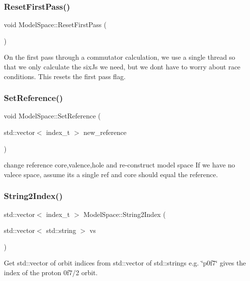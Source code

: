 \subsubsection{\texorpdfstring{Reset\+First\+Pass()}{ResetFirstPass()}}
{\footnotesize\ttfamily void Model\+Space\+::\+Reset\+First\+Pass (\begin{DoxyParamCaption}{ }\end{DoxyParamCaption})}

On the first pass through a commutator calculation, we use a single thread so that we only calculate the sixJ\textquotesingle{}s we need, but we don\textquotesingle{}t have to worry about race conditions. This resets the first pass flag. \mbox{\label{classModelSpace_a2c0036022f88a7f478e10c3d6006531e}} 
\subsubsection{\texorpdfstring{Set\+Reference()}{SetReference()}}
{\footnotesize\ttfamily void Model\+Space\+::\+Set\+Reference (\begin{DoxyParamCaption}\item[{std\+::vector$<$ index\+\_\+t $>$}]{new\+\_\+reference }\end{DoxyParamCaption})}

change reference core,valence,hole and re-\/construct model space If we have no valece space, assume it\textquotesingle{}s a single ref and core should equal the reference. \mbox{\label{classModelSpace_a11ac7aee125fb0a97cd3f1394c4cdb8f}} 
\subsubsection{\texorpdfstring{String2\+Index()}{String2Index()}}
{\footnotesize\ttfamily std\+::vector$<$ index\+\_\+t $>$ Model\+Space\+::\+String2\+Index (\begin{DoxyParamCaption}\item[{std\+::vector$<$ std\+::string $>$}]{vs }\end{DoxyParamCaption})}

Get std\+::vector of orbit indices from std\+::vector of std\+::strings e.\+g. \char`\"{}p0f7\char`\"{} gives the index of the proton 0f7/2 orbit. 

